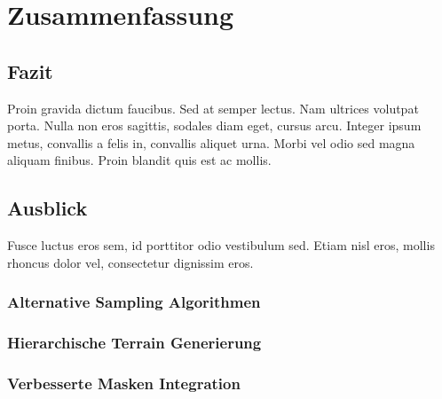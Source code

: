 \chapter{Zusammenfassung}

\section{Fazit}

Proin gravida dictum faucibus. Sed at semper lectus. Nam ultrices volutpat porta. Nulla non eros sagittis, sodales diam eget, cursus arcu. Integer ipsum metus, convallis a felis in, convallis aliquet urna. Morbi vel odio sed magna aliquam finibus. Proin blandit quis est ac mollis.\cite{join_study}

\section{Ausblick}

Fusce luctus eros sem, id porttitor odio vestibulum sed. Etiam nisl eros, mollis rhoncus dolor vel, consectetur dignissim eros. 

\subsection{Alternative Sampling Algorithmen}

\subsection{Hierarchische Terrain Generierung}



\subsection{Verbesserte Masken Integration}

